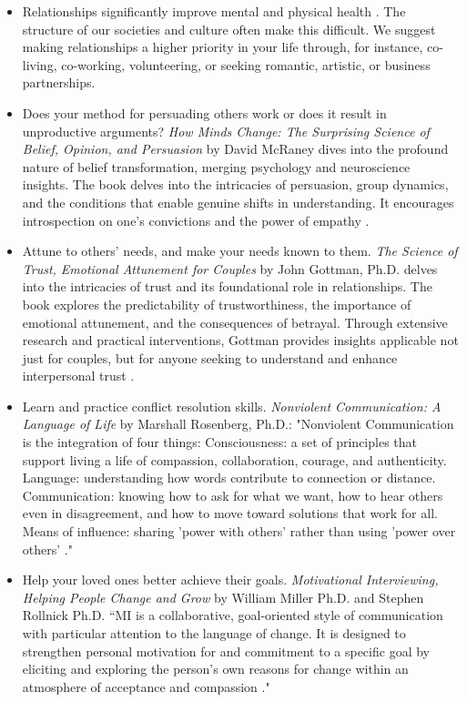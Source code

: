 \documentclass[12pt,letterpaper]{book}
\begin{document}
\begin{itemize}
    \item Relationships significantly improve mental and physical health \cite{holt-lunstadRelationships}. The structure of our societies and culture often make this difficult. We suggest making relationships a higher priority in your life through, for instance, co-living, co-working, volunteering, or seeking romantic, artistic, or business partnerships.  
    \item Does your method for persuading others work or does it result in unproductive arguments? \textit{How Minds Change: The Surprising Science of Belief, Opinion, and Persuasion} by David McRaney dives into the profound nature of belief transformation, merging psychology and neuroscience insights. The book delves into the intricacies of persuasion, group dynamics, and the conditions that enable genuine shifts in understanding. It encourages introspection on one's convictions and the power of empathy \cite{mcraneyMinds}.
    \item Attune to others' needs, and make your needs known to them. \textit{The Science of Trust, Emotional Attunement for Couples} by John Gottman, Ph.D. delves into the intricacies of trust and its foundational role in relationships. The book explores the predictability of trustworthiness, the importance of emotional attunement, and the consequences of betrayal. Through extensive research and practical interventions, Gottman provides insights applicable not just for couples, but for anyone seeking to understand and enhance interpersonal trust \cite{gottmanTrust}.
    \item Learn and practice conflict resolution skills. \textit{Nonviolent Communication: A Language of Life} by Marshall Rosenberg, Ph.D.: "Nonviolent Communication is the integration of four things: Consciousness: a set of principles that support living a life of compassion, collaboration, courage, and authenticity. Language: understanding how words contribute to connection or distance. Communication: knowing how to ask for what we want, how to hear others even in disagreement, and how to move toward solutions that work for all. Means of influence: sharing 'power with others' rather than using 'power over others' \cite{rosenbergNVC}."
    \item Help your loved ones better achieve their goals. \textit{Motivational Interviewing, Helping People Change and Grow} by William Miller Ph.D. and Stephen Rollnick Ph.D. “MI is a collaborative, goal-oriented style of communication with particular attention to the language of change. It is designed to strengthen personal motivation for and commitment to a specific goal by eliciting and exploring the person's own reasons for change within an atmosphere of acceptance and compassion \cite{millerMotivationalInterviewing}."

\end{itemize}
\end{document}
